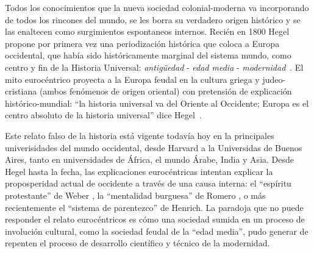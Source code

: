 \documentclass[a4paper,10pt]{book}
\begin{document}

Todos los conocimientos que la nueva sociedad colonial-moderna va incorporando de todos los rincones del mundo, se les borra su verdadero origen histórico y se las enaltecen como surgimientos espontaneos internos.
Recién en 1800 Hegel propone por primera vez una periodización histórica que coloca a Europa occidental, que había sido históricamente marginal del sistema mundo, como centro y fin de la Historia Universal: \emph{antigüedad} - \emph{edad media} - \emph{modernidad}~\cite{dussel2007}. 
El mito eurocéntrico proyecta a la Europa feudal en la cultura griega y judeo-cristiana (ambos fenómenos de origen oriental) con pretensión de explicación histórico-mundial: ``la historia universal va del Oriente al Occidente; Europa es el centro absoluto de la historia universal'' dice Hegel~\cite{hegel}.


Este relato falso de la historia está vigente todavía hoy en la principales univerisidades del mundo occidental, desde Harvard a la Universidas de Buenos Aires, tanto en universidades de África, el mundo Árabe, India y Asia.
Desde Hegel hasta la fecha, las explicaciones eurocéntricas intentan explicar la proposperidad actual de occidente a través de una causa interna: el ``espíritu protestante'' de Weber \cite{weber}, la ``mentalidad burguesa'' de Romero \cite{romero}, o más recientemente el ``sistema de parentezco''\cite{henrich} de Henrich.
La paradoja que no puede responder el relato eurocéntricos es cómo una sociedad sumida en un proceso de involución cultural, como la sociedad feudal de la ``edad media'', pudo generar de repenten el proceso de desarrollo científico y técnico de la modernidad.
\end{document}
